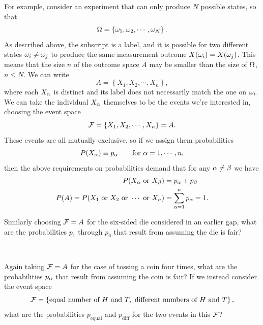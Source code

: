 For example, consider an experiment that can only produce $N$ possible states, so that
\begin{equation*}
  \Omega = \left\{\omega_1, \omega_2, \cdots, \omega_N\right\}.
\end{equation*}
As described above, the subscript is a label, and it is possible for two different states $\omega_i \ne \omega_j$ to produce the same measurement outcome $X(\omega_i) = X(\omega_j)$.
This means that the size $n$ of the outcome space $A$ may be smaller than the size of $\Omega$, $n \leq N$.
We can write
\begin{equation*}
  A = \left\{X_1, X_2, \cdots, X_n\right\},
\end{equation*}
where each $X_{\alpha}$ is distinct and its label does not necessarily match the one on $\omega_i$.
We can take the individual $X_{\alpha}$ themselves to be the events we're interested in, choosing the event space
\begin{equation}
  \label{eq:finite_set}
  \mathcal F = \left\{X_1, X_2, \cdots, X_n\right\} = A.
\end{equation}
These events are all mutually exclusive, so if we assign them probabilities
\begin{equation*}
  P(X_{\alpha}) \equiv p_{\alpha} \qquad \mbox{for } \alpha = 1, \cdots, n,
\end{equation*}
then the above requirements on probabilities demand that for any $\alpha \ne \beta$ we have
\begin{align*}
  P(X_{\alpha} \mbox{ or } X_{\beta}) & = p_{\alpha} + p_{\beta} \\
  P(A) = P(X_1 \hbox{ or } X_2 \hbox{ or } \cdots \mbox{ or } X_n) & = \sum_{\alpha = 1}^n p_{\alpha} = 1.
\end{align*}

Similarly choosing $\mathcal F = A$ for the six-sided die considered in an earlier gap, what are the probabilities $p_1$ through $p_6$ that result from assuming the die is fair?
\begin{mdframed}
  \ \\[95 pt]
\end{mdframed}
Again taking $\mathcal F = A$ for the case of tossing a coin four times, what are the probabilities $p_{\alpha}$ that result from assuming the coin is fair?
If we instead consider the event space
\begin{equation*}
  \mathcal F = \left\{\mbox{equal number of } H \mbox{ and } T, \mbox{ different numbers of } H \mbox{ and } T\right\},
\end{equation*}
what are the probabilities $p_{\text{equal}}$ and $p_{\text{diff}}$ for the two events in this $\mathcal F$?
\begin{mdframed}
  \ \\[95 pt]
\end{mdframed}

